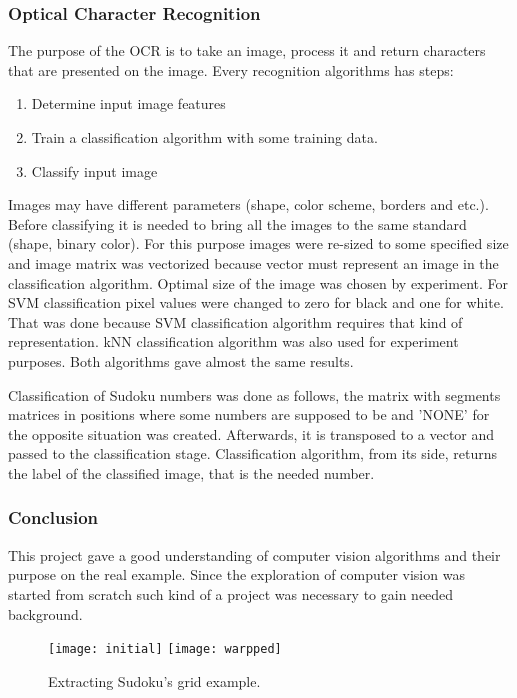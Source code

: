 \documentclass[../../main]{subfiles}
\begin{document}
\subsubsection{Optical Character Recognition}

The purpose of the OCR is to take an image, process it and return characters that are presented on the image.
Every recognition algorithms has steps:
\begin{enumerate}
\item  Determine input image features
\item  Train a classification algorithm with some training data.
\item  Classify input image
\end{enumerate}

Images may have different parameters (shape, color scheme, borders and etc.). Before classifying it is needed to bring all the images to the same standard (shape, binary color). For this purpose images were re-sized to some specified size and image matrix was vectorized because vector must represent an image in the classification algorithm. Optimal size of the image was chosen by experiment. For \ac{SVM} classification pixel values were changed to zero for black and one for white. That was done because \ac{SVM} classification algorithm requires that kind of representation. \ac{kNN} classification algorithm was also used for experiment purposes.
Both algorithms gave almost the same results.

Classification of Sudoku numbers was done as follows, the matrix with segments matrices in positions where some numbers are supposed to be and 'NONE' for the opposite situation was created. Afterwards, it is transposed to a vector and passed to the classification stage. Classification algorithm, from its side, returns the label of the classified image, that is the needed number.

\subsubsection{Conclusion}

This project gave a good understanding of computer vision algorithms and their purpose on the real example. Since the exploration of computer vision was started from scratch such kind of a project was necessary to gain needed background. 

\begin{figure} [ht!]
    \begin{center}
        \texttt{[image: initial]}
        \texttt{[image: warpped]}
        \caption{Extracting Sudoku's grid example.}
        \label{fig:sudoku_extraction}
    \end{center}
\end{figure}
\end{document}

